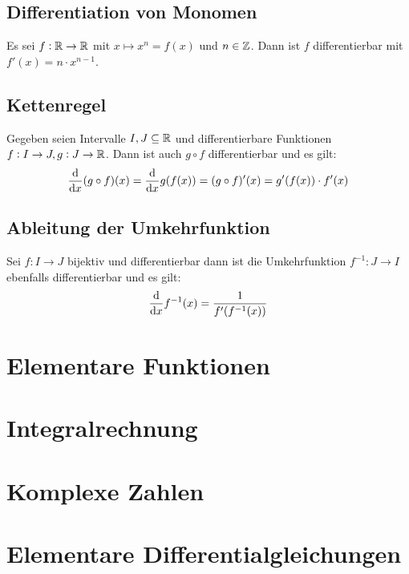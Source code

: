 \subsection{Differentiation von Monomen}
Es sei $f: \mathbb{R} \rightarrow \mathbb{R}$ mit $x \mapsto x^n = f(x)$ und $n \in \mathbb{Z}$.
Dann ist $f$ differentierbar mit $f'(x) = n \cdot x^{n-1}$.

\subsection{Kettenregel}
Gegeben seien Intervalle $I, J \subseteq \mathbb{R}$ und differentierbare
Funktionen $f: I \rightarrow J, g: J \rightarrow \mathbb{R}$. Dann ist auch
$g \circ f$ differentierbar und es gilt:
\begin{equation*}
    \dfrac{\text{d}}{\text{d}x}(g \circ f)(x) = \dfrac{\text{d}}{\text{d}x} g(f(x)) = (g \circ f)'(x)= g'(f(x)) \cdot f'(x)
\end{equation*}

\subsection{Ableitung der Umkehrfunktion}
Sei $f: I \rightarrow J$ bijektiv und differentierbar dann ist die
Umkehrfunktion $f^{-1}: J \rightarrow I$ ebenfalls differentierbar und
es gilt:
\begin{equation*}
    \dfrac{\text{d}}{\text{d}x} f^{-1}(x) = \dfrac{1}{f'(f^{-1}(x))}
\end{equation*}

\section{Elementare Funktionen}%
\section{Integralrechnung}%
\section{Komplexe Zahlen}%

\section{Elementare Differentialgleichungen}
